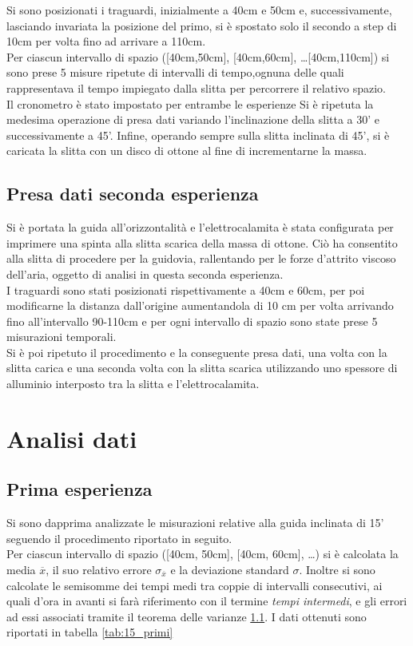 \documentclass[a4paper,11pt,oneside]{article}
\begin{document}
Si sono posizionati i traguardi, inizialmente a 40cm e 50cm e, successivamente, lasciando invariata la posizione del primo, si è spostato solo il secondo a step di 10cm per volta fino ad arrivare a 110cm. \\
Per ciascun intervallo di spazio ([40cm,50cm], [40cm,60cm], \dots [40cm,110cm]) si sono prese 5 misure ripetute di intervalli di tempo,ognuna delle quali rappresentava il tempo impiegato dalla slitta per percorrere il relativo spazio.\\  
Il cronometro è stato impostato per entrambe le esperienze
Si è ripetuta la medesima operazione di presa dati variando l'inclinazione della slitta a 30' e successivamente a 45'.
Infine, operando sempre sulla slitta inclinata di 45', si è caricata la slitta con un disco di ottone al fine di incrementarne la massa.

\subsection{Presa dati seconda esperienza}
Si è portata la guida all'orizzontalità e l'elettrocalamita è stata configurata per imprimere una spinta alla slitta scarica della massa di ottone. Ciò ha consentito alla slitta di procedere per la guidovia, rallentando per le forze d'attrito viscoso dell'aria, oggetto di analisi in questa seconda esperienza.\\
I traguardi sono stati posizionati rispettivamente a 40cm e 60cm, per poi modificarne la distanza dall'origine aumentandola di 10 cm per volta arrivando fino all'intervallo 90-110cm e per ogni intervallo di spazio sono state prese 5 misurazioni temporali.\\
Si è poi ripetuto il procedimento e la conseguente presa dati, una volta con la slitta carica e una seconda volta con la slitta scarica utilizzando uno spessore di alluminio interposto tra la slitta e l'elettrocalamita.

\section{Analisi dati}
\subsection{Prima esperienza}
Si sono dapprima analizzate le misurazioni relative alla guida inclinata di 15' seguendo il procedimento riportato in seguito.\\
Per ciascun intervallo di spazio ([40cm, 50cm], [40cm, 60cm], \dots) si è calcolata  la media $\overline{x}$, il suo relativo errore $\sigma_{\overline{x}}$ e la deviazione standard $\sigma$. Inoltre si sono calcolate le semisomme dei tempi medi tra coppie di intervalli consecutivi, ai quali d'ora in avanti si farà riferimento con il termine \textit{tempi intermedi}, e gli errori ad essi associati tramite il teorema delle varianze \ref{}.
I dati ottenuti sono riportati in tabella \ref{tab:15_primi}
\end{document}
